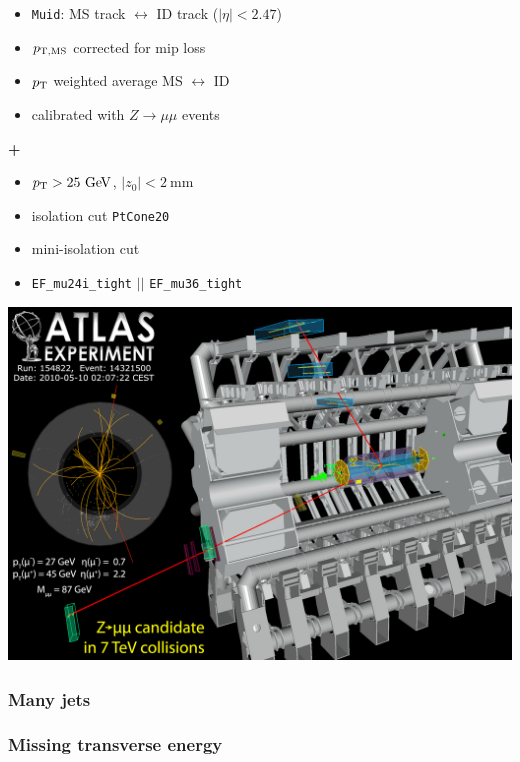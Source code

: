 \begin{frame}
\begin{minipage}{.5\textwidth}
\begin{itemize}
\item \texttt{Muid}: MS track $\leftrightarrow$ ID track ($|\eta|<2.47$)
\item $p_{\rm T,MS}$ corrected for mip loss
\item $p_{\rm T}$ weighted average MS $\leftrightarrow$ ID
\item calibrated with $Z\to \mu\mu$ events
\end{itemize}
{\cccolor \bfseries +}\\
\begin{itemize}
\item $\pt > 25\gev$, $|z_0|<2~$mm
\item isolation cut \texttt{PtCone20}
\item mini-isolation cut
\item \texttt{EF\_mu24i\_tight} $||$ \texttt{EF\_mu36\_tight}
\end{itemize}

\includegraphics[width=.78\textwidth,height=0.3\textheight]{pics/Zmumu}

\end{minipage}


\end{frame}



\begin{frame}\frametitle{Many jets}
\centering


\end{frame}



\begin{frame}\frametitle{Missing transverse energy}
\centering\myskip

\end{frame}


